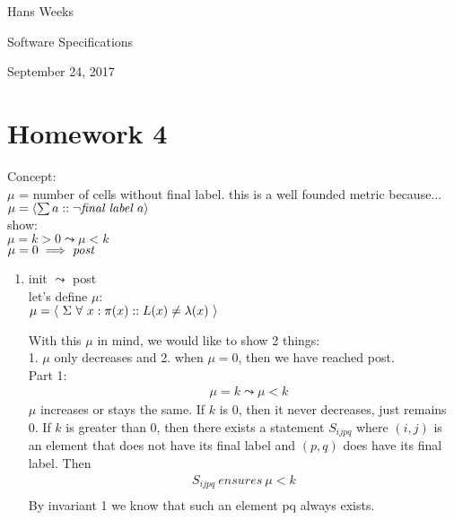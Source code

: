 \documentclass{article}
\begin{document}
\hfill Hans Weeks

\hfill Software Specifications

\hfill September 24, 2017
\section*{Homework 4}
Concept:\\ $\mu$ = number of cells without final label. this is a well founded metric because...\\
$\mu = \langle \sum a :: \neg \emph{final label } a \rangle$\\
show:\\
$\mu=k>0 \leadsto \mu<k$\\
$\mu=0\implies \emph{post}$\\
\begin{enumerate}


\item
init $\leadsto$ post\\
let's define $\mu$:\\
$\mu = \langle \ \Sigma \ \forall \ x : \pi(x) :: L(x) \neq \lambda(x) \ \rangle\\$

With this $\mu$ in mind, we would like to show 2 things:\\
1. $\mu$ only decreases and 2. when $\mu=0$, then we have reached post.\\

Part 1:\\
\begin{align*}
&\mu = k \leadsto \mu < k
\end{align*}
$\mu$ increases or stays the same. If $k$ is 0, then it never decreases, just remains 0. If $k$ is greater than 0, then there exists a statement $S_{ijpq}$ where $(i,j)$ is an element that does not have its final label and $(p,q)$ does have its final label. Then\\
\begin{align*}
S_{ijpq} \ ensures \ \mu < k\\
\end{align*}
By invariant 1 we know that such an element pq always exists.\\


\end{enumerate}
\end{document}
